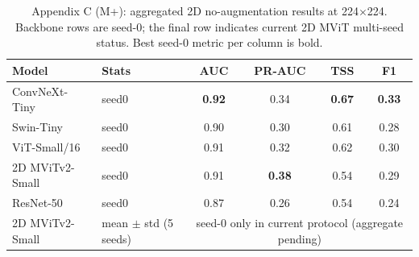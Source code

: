 \begin{table}[p]
\centering
\scriptsize
\caption{Appendix C (M+): aggregated 2D no-augmentation results at 224$\times$224. Backbone rows are seed-0; the final row indicates current 2D MViT multi-seed status. Best seed-0 metric per column is bold.}
\label{tab:appC_noaug_mplus}
\begin{tabular}{llcccc}
\toprule
Model & Stats & AUC & PR-AUC & TSS & F1 \\
\midrule
ConvNeXt-Tiny & seed0 & \textbf{0.92} & 0.34 & \textbf{0.67} & \textbf{0.33} \\
Swin-Tiny & seed0 & 0.90 & 0.30 & 0.61 & 0.28 \\
ViT-Small/16 & seed0 & 0.91 & 0.32 & 0.62 & 0.30 \\
2D MViTv2-Small & seed0 & 0.91 & \textbf{0.38} & 0.54 & 0.29 \\
ResNet-50 & seed0 & 0.87 & 0.26 & 0.54 & 0.24 \\
\midrule
2D MViTv2-Small & mean $\pm$ std (5 seeds) & \multicolumn{4}{c}{seed-0 only in current protocol (aggregate pending)} \\
\bottomrule
\end{tabular}
\end{table}
